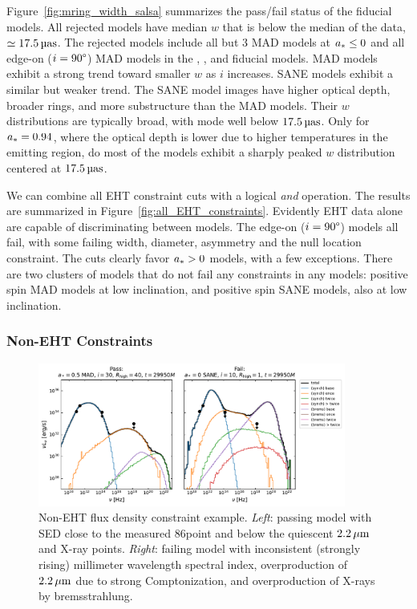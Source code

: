 Figure~\ref{fig:mring_width_salsa} summarizes the \mring  pass/fail status of the fiducial models.
All rejected models have median $w$ that is below the median of the data, $ \simeq 17.5\uas$.
The rejected models include all but 3 MAD models at $a_* \le 0$ and all edge-on ($i = 90\degree$) MAD models in the  \kharma, \bhac, and \hamr fiducial models.
MAD models exhibit a strong trend toward smaller $w$ as $i$ increases.
SANE models exhibit a similar but weaker trend.
The SANE model images have  higher optical depth, broader rings, and more substructure than the MAD models.
Their $w$ distributions are typically broad, with mode well below $17.5\uas$.
Only for $a_* = 0.94$, where the optical depth is lower due to higher temperatures in the emitting region, do most of the models exhibit a sharply peaked $w$ distribution centered at $17.5\uas$.


We can combine all EHT constraint cuts with a logical {\em and} operation.
The results are summarized in Figure~\ref{fig:all_EHT_constraints}.
Evidently EHT data alone are capable of discriminating between models.
The edge-on ($i = 90\degree$) models all fail, with some failing \mring width, diameter, asymmetry and the null location constraint.
The cuts clearly favor $a_* > 0$ models, with a few exceptions.
There are two clusters of models that do not fail any constraints in any models: positive spin MAD models at low inclination, and positive spin SANE models, also at low inclination.

\subsubsection{Non-EHT Constraints}

\begin{figure}[h!]
  \centering
  \includegraphics[width=0.9\textwidth]{figures/passfail_sed.pdf}
  \caption{%
    Non-EHT flux density constraint example.
    \emph{Left}: passing model with SED close to the measured 86\GHz point and below the quiescent $2.2\,\mu\mathrm{m}$ and X-ray points.
    \emph{Right}: failing model with inconsistent (strongly rising) millimeter wavelength spectral index, overproduction of $2.2\,\mu\mathrm{m}$ due to strong Comptonization, and overproduction of X-rays by bremsstrahlung.}
  \label{fig:passfail_sed}
\end{figure}

